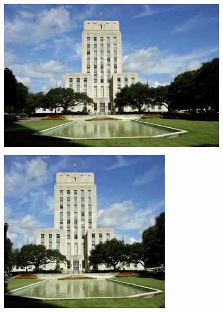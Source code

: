 \begin{figure}[H]
\includegraphics[height=8cm]{src/city.jpg}\\
\includegraphics[height=8cm]{result/city.png}
\centering
\end{figure}
